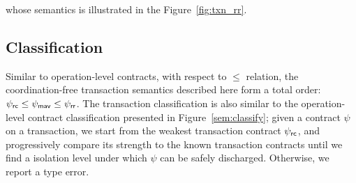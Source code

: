 \noindent whose semantics is illustrated in the Figure~\ref{fig:txn_rr}.

\subsection{Classification}

Similar to operation-level contracts, with respect to $\le$ relation, the
coordination-free transaction semantics described here form a total order:
$\psi_{\sf rc} \le \psi_{\sf mav} \le \psi_{\sf rr}$. The transaction classification is also similar to
the operation-level contract classification presented in
Figure~\ref{sem:classify}; given a contract $\psi$ on a transaction, we start
from the weakest transaction contract $\psi_{\sf rc}$, and progressively compare its
strength to the known transaction contracts until we find a isolation level
under which $\psi$ can be safely discharged. Otherwise, we report a type error.
